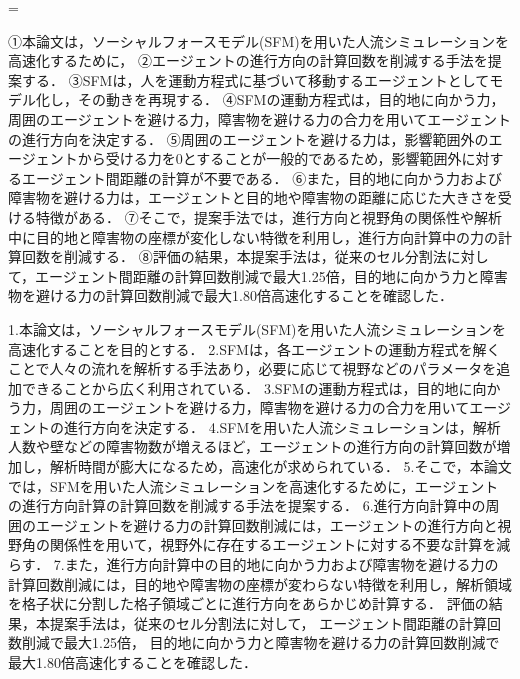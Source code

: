 
={
①本論文は，ソーシャルフォースモデル(SFM)を用いた人流シミュレーションを高速化するために，
②エージェントの進行方向の計算回数を削減する手法を提案する．
③SFMは，人を運動方程式に基づいて移動するエージェントとしてモデル化し，その動きを再現する．
④SFMの運動方程式は，目的地に向かう力，周囲のエージェントを避ける力，障害物を避ける力の合力を用いてエージェントの進行方向を決定する．
⑤周囲のエージェントを避ける力は，影響範囲外のエージェントから受ける力を0とすることが一般的であるため，影響範囲外に対するエージェント間距離の計算が不要である．
⑥また，目的地に向かう力および障害物を避ける力は，エージェントと目的地や障害物の距離に応じた大きさを受ける特徴がある．
⑦そこで，提案手法では，進行方向と視野角の関係性や解析中に目的地と障害物の座標が変化しない特徴を利用し，進行方向計算中の力の計算回数を削減する．
⑧評価の結果，本提案手法は，従来のセル分割法に対して，エージェント間距離の計算回数削減で最大1.25倍，目的地に向かう力と障害物を避ける力の計算回数削減で最大1.80倍高速化することを確認した．

1.本論文は，ソーシャルフォースモデル(SFM)を用いた人流シミュレーションを高速化することを目的とする．
2.SFMは，各エージェントの運動方程式を解くことで人々の流れを解析する手法あり，必要に応じて視野などのパラメータを追加できることから広く利用されている．
3.SFMの運動方程式は，目的地に向かう力，周囲のエージェントを避ける力，障害物を避ける力の合力を用いてエージェントの進行方向を決定する．
4.SFMを用いた人流シミュレーションは，解析人数や壁などの障害物数が増えるほど，エージェントの進行方向の計算回数が増加し，解析時間が膨大になるため，高速化が求められている．
5.そこで，本論文では，SFMを用いた人流シミュレーションを高速化するために，エージェントの進行方向計算の計算回数を削減する手法を提案する．
6.進行方向計算中の周囲のエージェントを避ける力の計算回数削減には，エージェントの進行方向と視野角の関係性を用いて，視野外に存在するエージェントに対する不要な計算を減らす．
7.また，進行方向計算中の目的地に向かう力および障害物を避ける力の計算回数削減には，目的地や障害物の座標が変わらない特徴を利用し，解析領域を格子状に分割した格子領域ごとに進行方向をあらかじめ計算する．
評価の結果，本提案手法は，従来のセル分割法に対して，
エージェント間距離の計算回数削減で最大1.25倍，
目的地に向かう力と障害物を避ける力の計算回数削減で最大1.80倍高速化することを確認した．
}

